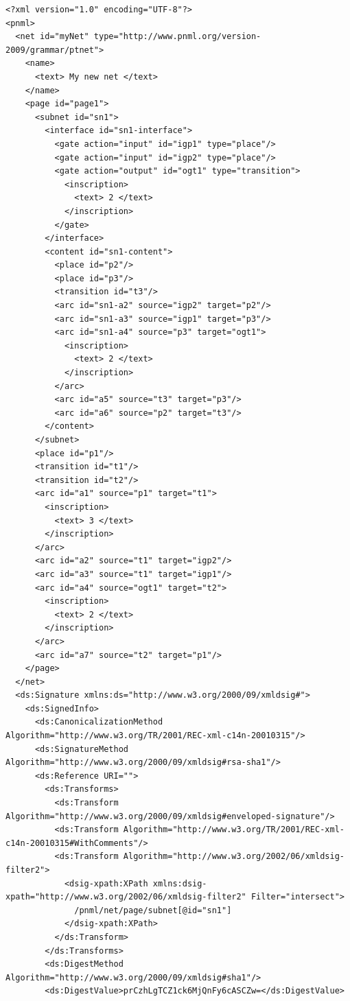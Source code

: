 \begin{lstlisting}[basicstyle=\ttfamily\tiny]
<?xml version="1.0" encoding="UTF-8"?>
<pnml>
  <net id="myNet" type="http://www.pnml.org/version-2009/grammar/ptnet">
    <name>
      <text> My new net </text>
    </name>
    <page id="page1">
      <subnet id="sn1">
        <interface id="sn1-interface">
          <gate action="input" id="igp1" type="place"/>
          <gate action="input" id="igp2" type="place"/>
          <gate action="output" id="ogt1" type="transition">
            <inscription>
              <text> 2 </text>
            </inscription>
          </gate>
        </interface>
        <content id="sn1-content">
          <place id="p2"/>
          <place id="p3"/>
          <transition id="t3"/>
          <arc id="sn1-a2" source="igp2" target="p2"/>
          <arc id="sn1-a3" source="igp1" target="p3"/>
          <arc id="sn1-a4" source="p3" target="ogt1">
            <inscription>
              <text> 2 </text>
            </inscription>
          </arc>
          <arc id="a5" source="t3" target="p3"/>
          <arc id="a6" source="p2" target="t3"/>
        </content>
      </subnet>
      <place id="p1"/>
      <transition id="t1"/>
      <transition id="t2"/>
      <arc id="a1" source="p1" target="t1">
        <inscription>
          <text> 3 </text>
        </inscription>
      </arc>
      <arc id="a2" source="t1" target="igp2"/>
      <arc id="a3" source="t1" target="igp1"/>
      <arc id="a4" source="ogt1" target="t2">
        <inscription>
          <text> 2 </text>
        </inscription>
      </arc>
      <arc id="a7" source="t2" target="p1"/>
    </page>
  </net>
  <ds:Signature xmlns:ds="http://www.w3.org/2000/09/xmldsig#">
    <ds:SignedInfo>
      <ds:CanonicalizationMethod Algorithm="http://www.w3.org/TR/2001/REC-xml-c14n-20010315"/>
      <ds:SignatureMethod Algorithm="http://www.w3.org/2000/09/xmldsig#rsa-sha1"/>
      <ds:Reference URI="">
        <ds:Transforms>
          <ds:Transform Algorithm="http://www.w3.org/2000/09/xmldsig#enveloped-signature"/>
          <ds:Transform Algorithm="http://www.w3.org/TR/2001/REC-xml-c14n-20010315#WithComments"/>
          <ds:Transform Algorithm="http://www.w3.org/2002/06/xmldsig-filter2">
            <dsig-xpath:XPath xmlns:dsig-xpath="http://www.w3.org/2002/06/xmldsig-filter2" Filter="intersect">
              /pnml/net/page/subnet[@id="sn1"]
            </dsig-xpath:XPath>
          </ds:Transform>
        </ds:Transforms>
        <ds:DigestMethod Algorithm="http://www.w3.org/2000/09/xmldsig#sha1"/>
        <ds:DigestValue>prCzhLgTCZ1ck6MjQnFy6cASCZw=</ds:DigestValue>

\end{lstlisting}
